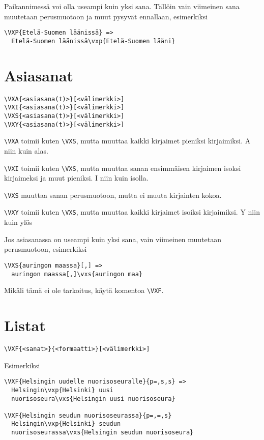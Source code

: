 \documentclass[12pt]{article}
\begin{document}
Paikannimessä voi olla useampi kuin yksi sana. Tällöin vain viimeinen
sana muutetaan perusmuotoon ja muut pysyvät ennallaan, esimerkiksi

\begin{verbatim}
\VXP{Etelä-Suomen läänissä} =>
  Etelä-Suomen läänissä\vxp{Etelä-Suomen lääni}
\end{verbatim}

\section*{Asiasanat}

\begin{verbatim}
\VXA{<asiasana(t)>}[<välimerkki>]
\VXI{<asiasana(t)>}[<välimerkki>]
\VXS{<asiasana(t)>}[<välimerkki>]
\VXY{<asiasana(t)>}[<välimerkki>]
\end{verbatim}

\verb=\VXA= toimii kuten \verb=\VXS=, mutta muuttaa kaikki kirjaimet
pieniksi kirjaimiksi. A niin kuin alas.

\verb=\VXI= toimii kuten \verb=\VXS=, mutta muuttaa sanan
ensimmäisen kirjaimen isoksi kirjaimeksi ja muut pieniksi.
I niin kuin isolla.

\verb=\VXS= muuttaa sanan perusmuotoon, mutta ei muuta kirjainten kokoa.

\verb=\VXY= toimii kuten \verb=\VXS=, mutta muuttaa kaikki kirjaimet
isoiksi kirjaimiksi. Y niin kuin ylös

Jos asiasanassa on useampi kuin yksi sana, vain viimeinen muutetaan
perusmuotoon, esimerkiksi

\begin{verbatim}
\VXS{auringon maassa}[,] =>
  auringon maassa[,]\vxs{auringon maa}
\end{verbatim}

Mikäli tämä ei ole tarkoitus, käytä komentoa \verb=\VXF=.


\section*{Listat}

\begin{verbatim}
\VXF{<sanat>}{<formaatti>}[<välimerkki>]
\end{verbatim}

Esimerkiksi

\begin{verbatim}
\VXF{Helsingin uudelle nuorisoseuralle}{p=,s,s} =>
  Helsingin\vxp{Helsinki} uusi
  nuorisoseura\vxs{Helsingin uusi nuorisoseura}

\VXF{Helsingin seudun nuorisoseurassa}{p=,=,s}
  Helsingin\vxp{Helsinki} seudun
  nuorisoseurassa\vxs{Helsingin seudun nuorisoseura}
\end{verbatim}
\end{document}
